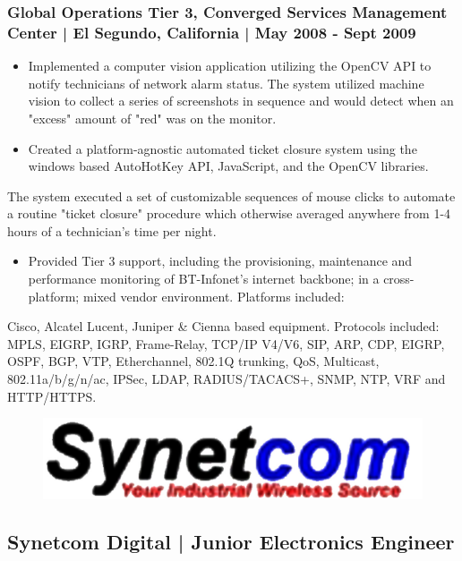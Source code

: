 \documentclass[letter,10pt]{article}
\begin{document}
\subsubsection*{Global Operations Tier 3, Converged Services Management Center | El Segundo, California | May 2008 - Sept 2009}
\label{sec:org29eb47e}
\begin{itemize}
\item Implemented a computer vision application utilizing the OpenCV API to notify technicians of network alarm status. The system utilized machine vision to collect a series of screenshots in sequence and would detect when an "excess" amount of "red" was on the monitor.
\item Created a platform-agnostic automated ticket closure system using the windows based AutoHotKey API, JavaScript, and the OpenCV libraries.
\end{itemize}
The system executed a set of customizable sequences of mouse clicks to automate a routine "ticket closure" procedure which otherwise averaged anywhere from 1-4 hours of a technician's time per night. 
\begin{itemize}
\item Provided Tier 3 support, including the provisioning, maintenance and performance monitoring of BT-Infonet's internet backbone; in a cross-platform; mixed vendor environment. Platforms included:
\end{itemize}
Cisco, Alcatel Lucent, Juniper \& Cienna based equipment. Protocols included: MPLS, EIGRP, IGRP, Frame-Relay, TCP/IP V4/V6, SIP, ARP, CDP, EIGRP, OSPF, BGP, VTP, Etherchannel, 802.1Q trunking, QoS, Multicast, 802.11a/b/g/n/ac, IPSec, LDAP, RADIUS/TACACS+, SNMP, NTP, VRF and HTTP/HTTPS.




\begin{figure}
\includegraphics[width=0.8\linewidth]{./img/50p_cr_synetcom.jpg}
\end{figure}

\subsection*{Synetcom Digital | Junior Electronics Engineer}
\label{sec:orgbc73468}
\end{document}
